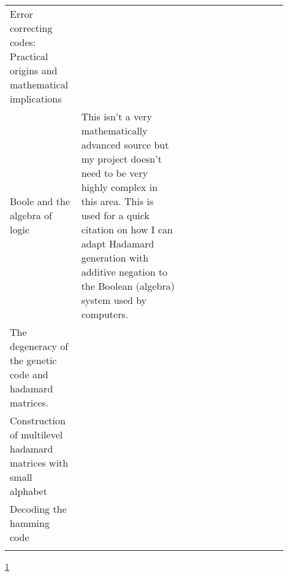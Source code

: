 \documentclass{article}
\begin{document}
\begin{center}
{\begin{longtable}{p{0.2\linewidth} p{0.35\linewidth} p{0.35\linewidth}}
    Error correcting codes: Practical origins and mathematical implications \citep*{CodesOrigins1978Pless} &

    \\

    Boole and the algebra of logic \citep*{BooleRecords1956Kneale} &

    This isn't a very mathematically advanced source but my project doesn't
    need to be very highly complex in this area. This is used for a quick
    citation on how I can adapt Hadamard generation with additive negation to
    the Boolean (algebra) system used by computers.

    \\

    The degeneracy of the genetic code and hadamard matrices. \citep*{DegeneracyHadamard2008Petoukhov}

    \\

    Construction of multilevel hadamard matrices with small alphabet \citep*{MultilevelConstruction2008TrinhFan}

    \\

    Decoding the hamming code \citep*{DecodingHamming2006Eherenborg}

    \\

    \bottomrule
    \label{tab:sourceeval}
    \end{longtable}
    }

    \ref{tab:sourceeval}
    \end{center}

    
    
\end{document}
